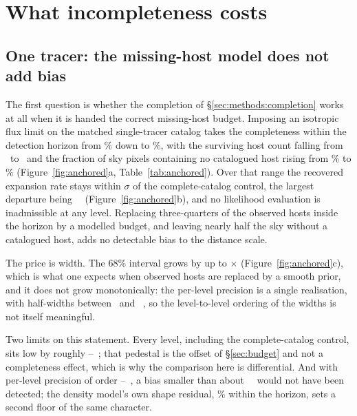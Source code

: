 \section{What incompleteness costs}
\label{sec:completeness}

\subsection{One tracer: the missing-host model does not add bias}
\label{sec:completeness:single}

The first question is whether the completion of \S\ref{sec:methods:completion}
works at all when it is handed the correct missing-host budget. Imposing an
isotropic flux limit on the matched single-tracer catalog takes the completeness
within the detection horizon from \AncCompleteC\% down to \AncMeighteenC\%, with
the surviving host count falling from \AncCompleteNHosts\ to
\AncMeighteenNHosts\ and the fraction of sky pixels containing no catalogued
host rising from \AncCompleteEmpty\% to \AncMeighteenEmpty\%
(Figure~\ref{fig:anchored}a, Table~\ref{tab:anchored}). Over that range the
recovered expansion rate stays within \AncMaxSigCtl$\sigma$ of the
complete-catalog control, the largest departure being
\AncMaxOffCtl~\kmsmpc\ (Figure~\ref{fig:anchored}b), and no likelihood
evaluation is inadmissible at any level. Replacing three-quarters of the
observed hosts inside the horizon by a modelled budget, and leaving nearly half
the sky without a catalogued host, adds no detectable bias to the distance scale.

The price is width. The 68\% interval grows by up to \AncMaxGrowth$\times$
(Figure~\ref{fig:anchored}c), which is what one expects when observed hosts are
replaced by a smooth prior, and it does not grow monotonically: the per-level
precision is a single realisation, with half-widths between \AncHwLo\ and
\AncHwHi~\kmsmpc, so the level-to-level ordering of the widths is not itself
meaningful.

Two limits on this statement. Every level, including the complete-catalog
control, sits low by roughly \AncCompleteOffAbs--\AncMtwentyOffAbs~\kmsmpc; that
pedestal is the offset of \S\ref{sec:budget} and not a completeness effect,
which is why the comparison here is differential. And with per-level precision
of order \AncHwLo--\AncHwHi~\kmsmpc, a bias smaller than about
\AncHwLo~\kmsmpc\ would not have been detected; the density model's own shape
residual, \AncResidHorizon\% within the horizon, sets a second floor of the same
character.

